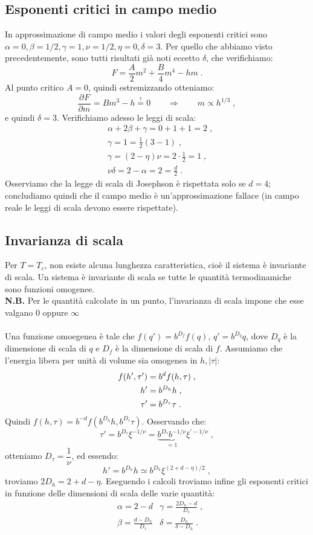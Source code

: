 \documentclass[10pt,a4paper]{report}
\theoremstyle{definition}
\newcommand{\pdev}[3][]{\frac{\partial^{#1} #2}{\partial #3^{#1}}}
\numberwithin{equation}{section}
\begin{document}
\subsection{Esponenti critici in campo medio}
In approssimazione di campo medio i valori degli esponenti critici sono $\alpha=0,\beta=1/2,\gamma=1,\nu=1/2,\eta=0,\delta=3$. Per quello che abbiamo visto precedentemente, sono tutti risultati già noti eccetto $\delta$, che verifichiamo:
$$
F=\frac{A}{2}m^2+\frac{B}{4}m^4-hm\;.
$$
Al punto critico $A=0$, quindi estremizzando otteniamo:
$$
\pdev{F}{m}=Bm^3-h\stackrel{!}{=}0\qquad \Longrightarrow\qquad m\propto h^{1/3}\;,
$$
e quindi $\delta=3$. Verifichiamo adesso le leggi di scala:
\begin{align*}
&\alpha+2\beta+\gamma=0+1+1=2\;, \\
&\gamma=1=\frac{1}{2}(3-1)\;, \\
&\gamma=(2-\eta)\nu=2\cdot\frac{1}{2}=1\;, \\
&\nu\delta=2-\alpha=2=\frac{d}{2}\;.
\end{align*}
Osserviamo che la legge di scala di Josephson è rispettata solo se $d=4$; concludiamo quindi che il campo medio è un'approssimazione fallace (in campo reale le leggi di scala devono essere rispettate).
\subsection{Invarianza di scala}
Per $T=T_c$, non esiste alcuna lunghezza caratteristica, cioè il sistema è invariante di scala. Un sistema è invariante di scala se tutte le quantità termodinamiche sono funzioni omogenee. \\
\textbf{N.B.} Per le quantità calcolate in un punto, l'invarianza di scala impone che esse valgano 0 oppure $\infty$ \\
\\
Una funzione omoegenea è tale che $f(q')=b^{D_f}f(q)$, $q'=b^{D_q}q$, dove $D_q$ è la dimensione di scala di $q$ e $D_f$ è la dimensione di scala di $f$. Assumiamo che l'energia libera per unità di volume sia omogenea in $h,|\tau|$:
\begin{align}
f(h',\tau')&=b^df(h,\tau)\;, \\
h'&= b^{D_h}h \notag\;, \\
\tau'&=b^{D_{\tau}}\tau\;.
\end{align}
Quindi $f(h,\tau)=b^{-d}f(b^{D_h}h,b^{D_{\tau}}\tau)$. Osservando che:
\begin{equation}
\tau'=b^{D_{\tau}}\xi^{-1/\nu}=\underbrace{b^{D_{\tau}}b^{-1/\nu}}_{=1}\xi^{' -1/\nu}\;,
\end{equation}
otteniamo $D_{\tau}=\dfrac{1}{\nu}$, ed essendo:
\begin{equation}
h'=b^{D_h}h\simeq b^{D_h}\xi^{(2+d-\eta)/2}\;,
\end{equation}
troviamo $2D_h=2+d-\eta$. Eseguendo i calcoli troviamo infine gli esponenti critici in funzione delle dimensioni di scala delle varie quantità:
\begin{align*}
&\alpha =2-d &\gamma=\frac{2D_h-d}{D_{\tau}}\;, \\
&\beta=\frac{d-D_h}{D_{\tau}} &\delta=\frac{D_h}{\delta-D_h}\;.
\end{align*}
\end{document}
